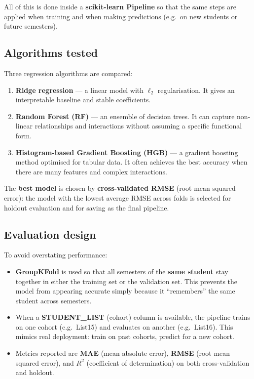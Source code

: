 \documentclass[12pt,a4paper]{article}
\begin{document}
All of this is done inside a \textbf{scikit-learn Pipeline} so that the same steps are applied when training and when making predictions (e.g.\ on new students or future semesters).

\subsection{Algorithms tested}

Three regression algorithms are compared:

\begin{enumerate}
  \item \textbf{Ridge regression} --- a linear model with \(\ell_2\) regularisation. It gives an interpretable baseline and stable coefficients.
  \item \textbf{Random Forest (RF)} --- an ensemble of decision trees. It can capture non-linear relationships and interactions without assuming a specific functional form.
  \item \textbf{Histogram-based Gradient Boosting (HGB)} --- a gradient boosting method optimised for tabular data. It often achieves the best accuracy when there are many features and complex interactions.
\end{enumerate}

The \textbf{best model} is chosen by \textbf{cross-validated RMSE} (root mean squared error): the model with the lowest average RMSE across folds is selected for holdout evaluation and for saving as the final pipeline.

\subsection{Evaluation design}

To avoid overstating performance:

\begin{itemize}
  \item \textbf{GroupKFold} is used so that all semesters of the \textbf{same student} stay together in either the training set or the validation set. This prevents the model from appearing accurate simply because it ``remembers'' the same student across semesters.
  \item When a \textbf{STUDENT\_LIST} (cohort) column is available, the pipeline trains on one cohort (e.g.\ List15) and evaluates on another (e.g.\ List16). This mimics real deployment: train on past cohorts, predict for a new cohort.
  \item Metrics reported are \textbf{MAE} (mean absolute error), \textbf{RMSE} (root mean squared error), and \textbf{\(R^2\)} (coefficient of determination) on both cross-validation and holdout.
\end{itemize}
\end{document}
